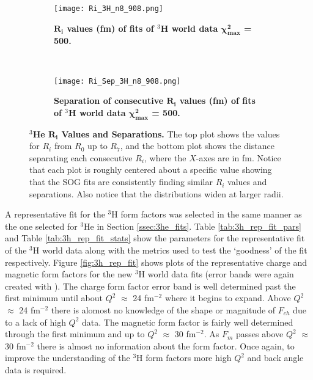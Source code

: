 \begin{figure}[!ht]
\begin{subfigure}{1.\textwidth}
  \centering
  \texttt{[image: Ri\_3H\_n8\_908.png]}
  \caption{\bf{$\boldsymbol{R_i}$ values (fm) of fits of $^3$H world data $\boldsymbol{\chi^2_{max}}$ = 500.}}
  \label{fig:3h_ri_ind}
\end{subfigure}\\
\begin{subfigure}{1.\textwidth}
  \centering
  \texttt{[image: Ri\_Sep\_3H\_n8\_908.png]}
  \caption{\bf{Separation of consecutive $\boldsymbol{R_i}$ values (fm) of fits of $^3$H world data $\boldsymbol{\chi^2_{max}}$ = 500.}}
  \label{fig:3h_ri_sep}
\end{subfigure}
\caption[$^3$He $R_i$ Values and Separations]{{\bf{$^3$He $\boldsymbol{R_i}$ Values and Separations.}} The top plot shows the values for $R_i$ from $R_0$ up to $R_7$, and the bottom plot shows the distance separating each consecutive $R_i$, where the $X$-axes are in fm. Notice that each plot is roughly centered about a specific value showing that the SOG fits are consistently finding similar $R_i$ values and separations. Also notice that the distributions widen at larger radii.}
\label{fig:3h_ri}
\end{figure}

A representative fit for the $^3$H form factors was selected in the same manner as the one selected for $^3$He in Section \ref{ssec:3he_fits}. Table \ref{tab:3h_rep_fit_pars} and Table \ref{tab:3h_rep_fit_stats} show the parameters for the representative fit of the $^3$H world data along with the metrics used to test the `goodness' of the fit respectively. Figure \ref{fig:3h_rep_fit} shows plots of the representative charge and magnetic form factors for the new $^3$H world data fits (error bands were again created with \cite{web_plot_digitizer}). The charge form factor error band is well determined past the first minimum until about $Q^2$ $\approx$ 24 fm$^{-2}$ where it begins to expand. Above $Q^2$ $\approx$ 24 fm$^{-2}$ there is alomost no knowledge of the shape or magnitude of $F_{ch}$ due to a lack of high $Q^2$ data. The magnetic form factor is fairly well determined through the first minimum and up to $Q^2$ $\approx$ 30 fm$^{-2}$. As $F_m$ passes above $Q^2$ $\approx$ 30 fm$^{-2}$ there is almost no information about the form factor. Once again, to improve the understanding of the $^3$H form factors more high $Q^2$ and back angle data is required.

